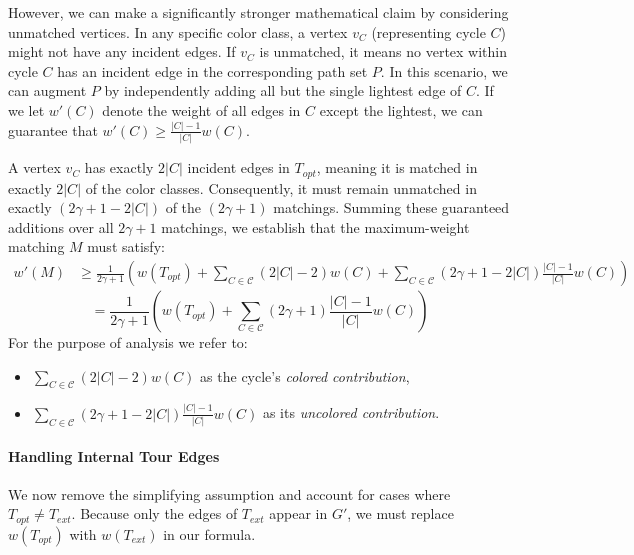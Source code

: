 However, we can make a significantly stronger mathematical claim by considering
unmatched vertices. In any specific color class, a vertex $v_C$ (representing
cycle $C$) might not have any incident edges. If $v_C$ is unmatched, it means no
vertex within cycle $C$ has an incident edge in the corresponding path set $P$.
In this scenario, we can augment $P$ by independently adding all but the single
lightest edge of $C$. If we let $w'(C)$ denote the weight of all edges in $C$
except the lightest, we can guarantee that $w'(C) \ge \frac{|C| - 1}{|C|}w(C)$.

A vertex $v_C$ has exactly $2|C|$ incident edges in $T_{opt}$, meaning it is
matched in exactly $2|C|$ of the color classes. Consequently, it must remain
unmatched in exactly $(2\gamma + 1 - 2|C|)$ of the $(2\gamma + 1)$ matchings.
Summing these guaranteed additions over all $2\gamma + 1$ matchings, we
establish that the maximum-weight matching $M$ must satisfy:
\begin{align}\label{eq:version3_eq4}
w'(M) &\ge \frac{1}{2\gamma + 1} \left( w(T_{opt}) + \sum_{C \in \mathcal{C}} (2|C| - 2)w(C) + \sum_{C \in \mathcal{C}} (2\gamma + 1 - 2|C|)\frac{|C| - 1}{|C|}w(C) \right)
\end{align}
\begin{equation} \label{eq:version3_eq5}
= \frac{1}{2\gamma + 1} \left( w(T_{opt}) + \sum_{C \in \mathcal{C}} (2\gamma + 1)\frac{|C| - 1}{|C|}w(C) \right)
\end{equation}
For the purpose of analysis we refer to:
\begin{itemize}[itemsep=4pt, topsep=4pt]
    \item $\displaystyle\sum_{C \in \mathcal{C}} (2|C| - 2)w(C)$ as the cycle's
    \textit{colored contribution},
    \item $\displaystyle\sum_{C \in \mathcal{C}} (2\gamma + 1 - 2|C|)\frac{|C| -
    1}{|C|}w(C)$ as its \textit{uncolored contribution}.
\end{itemize}

\paragraph{Handling Internal Tour Edges}
We now remove the simplifying assumption and account for cases where $T_{opt}
\neq T_{ext}$. Because only the edges of $T_{ext}$ appear in $G'$, we must
replace $w(T_{opt})$ with $w(T_{ext})$ in our formula.

